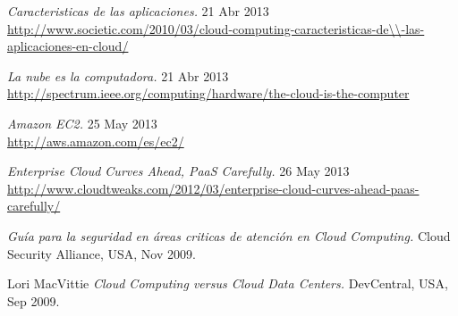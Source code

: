 \documentclass[12pt,a4paper]{article}
\begin{document}
\begin{thebibliography}{1}

\emph{Caracteristicas de las aplicaciones. }
 21 Abr 2013\\
\url{http://www.societic.com/2010/03/cloud-computing-caracteristicas-de\\-las-aplicaciones-en-cloud/}
 
\emph{La nube es la computadora. } 
 21 Abr 2013\\
 \url{http://spectrum.ieee.org/computing/hardware/the-cloud-is-the-computer}

\emph{Amazon EC2. }
 25 May 2013\\
 \url{http://aws.amazon.com/es/ec2/} 

\emph{Enterprise Cloud Curves Ahead, PaaS Carefully. }
 26 May 2013\\
 \url{http://www.cloudtweaks.com/2012/03/enterprise-cloud-curves-ahead-paas-carefully/}

\emph{Guía para la seguridad en áreas criticas de atención en Cloud Computing. } Cloud Security 
Alliance,
 USA, Nov 2009.

	Lori MacVittie	
	\emph{Cloud Computing versus Cloud Data Centers.} DevCentral,
	USA,
	Sep 2009. 	

\end{thebibliography}
\end{document}
